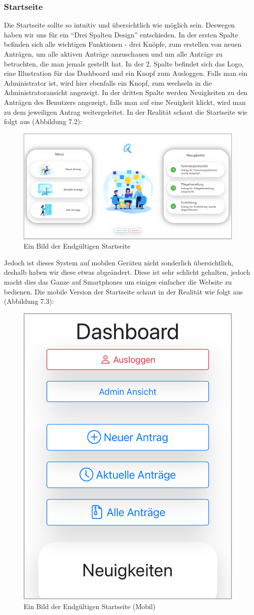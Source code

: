 \subsubsection{Startseite}
Die Startseite sollte so intuitiv und übersichtlich wie möglich sein. Deswegen haben wir uns für ein \enquote{Drei Spalten Design} entschieden. In der ersten Spalte befinden sich alle wichtigen Funktionen - drei Knöpfe, zum erstellen von neuen Anträgen, um alle aktiven Anträge anzuschauen und um alle Anträge zu betrachten, die man jemals gestellt hat. In der 2. Spalte befindet sich das Logo, eine Illustration für das Dashboard und ein Knopf zum Ausloggen. Falls man ein Administrator ist, wird hier ebenfalls ein Knopf, zum wechseln in die Administratoransicht angezeigt. In der dritten Spalte werden Neuigkeiten zu den Anträgen des Benutzers angezeigt, falls man auf eine Neuigkeit klickt, wird man zu dem jeweiligen Antrag weitergeleitet. In der Realität schaut die Startseite wie folgt aus (Abbildung 7.2):
\begin{figure}[H]
	\centering
	\includegraphics[width=1\linewidth]{images/website/dashboard}
	\caption[Dashboard]{Ein Bild der Endgültigen Startseite}
	\label{fig:dashboard}
\end{figure}
Jedoch ist dieses System auf mobilen Geräten nicht sonderlich übersichtlich, deshalb haben wir diese etwas abgeändert. Diese ist sehr schlicht gehalten, jedoch macht dies das Ganze auf Smartphones um einiges einfacher die Website zu bedienen. Die mobile Version der Startseite schaut in der Realität wie folgt aus (Abbildung 7.3):
\begin{figure}[H]
	\centering
	\includegraphics[width=0.4\linewidth]{images/website/dashboard_mobile}
	\caption[Dashboard Mobil]{Ein Bild der Endgültigen Startseite (Mobil)}
	\label{fig:dashboardmobile}
\end{figure}


